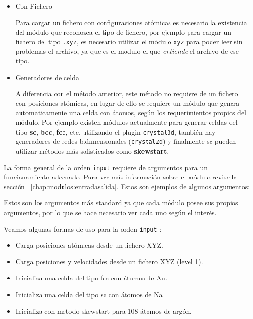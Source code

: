 \begin{itemize}
 \item{Con Fichero}

Para cargar un fichero con configuraciones at\'omicas es necesario la existencia del m\'odulo que reconozca el tipo de fichero, por ejemplo para cargar un fichero del tipo \verb|.xyz|, es necesario utilizar el m\'odulo \verb|xyz| para poder leer sin problemas el archivo, ya que es el m\'odulo el que \textit{entiende} el archivo de ese tipo. 
  \item{Generadores de celda}

A diferencia con el m\'etodo anterior, este m\'etodo no requiere de un fichero con posiciones at\'omicas, en lugar de ello se requiere un m\'odulo que genera automaticamente una celda con \'atomos, seg\'un los requerimientos propios del m\'odulo. Por ejemplo existen m\'odulos actualmente para generar celdas del tipo \textbf{sc}, \textbf{bcc}, \textbf{fcc}, etc. utilizando el plugin \verb|crystal3d|, tambi\'en hay generadores de redes bidimensionales (\verb|crystal2d|) y finalmente se pueden utilizar m\'etodos m\'as sofisticados como \textbf{skewstart}.

\end{itemize}

La forma general de la orden \verb|input| requiere de argumentos para un funcionamiento adecuado. Para ver m\'as informaci\'on sobre el m\'odulo revise la secci\'on ~\ref{chap:modulos:entradasalida}. Estos son ejemplos de algunos argumentos:


Estos son los argumentos m\'as standard ya que cada m\'odulo posee sus propios argumentos, por lo que se hace necesario ver cada uno seg\'un el inter\'es.

Veamos algunas formas de uso para la orden \verb|input| :

\begin{itemize}
\item Carga posiciones at\'omicas desde un fichero XYZ.
\item Carga posiciones y velocidades desde un fichero XYZ (level 1).
\item Inicializa una celda del tipo fcc con átomos de Au.
\item Inicializa una celda del tipo sc con átomos de Na
\item Inicializa con metodo skewstart para 108 \'atomos de arg\'on.
\end{itemize}

